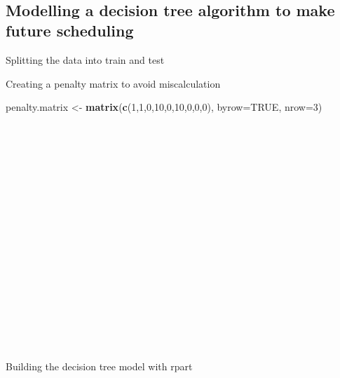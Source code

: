 \documentclass[
]{article}
\newenvironment{Shaded}{\begin{snugshade}}{\end{snugshade}}
\newcommand{\DataTypeTok}[1]{\textcolor[rgb]{0.13,0.29,0.53}{#1}}
\newcommand{\DecValTok}[1]{\textcolor[rgb]{0.00,0.00,0.81}{#1}}
\newcommand{\FloatTok}[1]{\textcolor[rgb]{0.00,0.00,0.81}{#1}}
\newcommand{\KeywordTok}[1]{\textcolor[rgb]{0.13,0.29,0.53}{\textbf{#1}}}
\newcommand{\NormalTok}[1]{#1}
\newcommand{\OperatorTok}[1]{\textcolor[rgb]{0.81,0.36,0.00}{\textbf{#1}}}
\newcommand{\OtherTok}[1]{\textcolor[rgb]{0.56,0.35,0.01}{#1}}
\newcommand{\StringTok}[1]{\textcolor[rgb]{0.31,0.60,0.02}{#1}}
\begin{document}
~

~

~

~

\hypertarget{modelling-a-decision-tree-algorithm-to-make-future-scheduling}{%
\subsection{Modelling a decision tree algorithm to make future
scheduling}\label{modelling-a-decision-tree-algorithm-to-make-future-scheduling}}

Splitting the data into train and test

\begin{Shaded}
\end{Shaded}

Creating a penalty matrix to avoid miscalculation

\begin{Shaded}
\begin{Highlighting}[]
\NormalTok{penalty.matrix <-}\StringTok{ }\KeywordTok{matrix}\NormalTok{(}\KeywordTok{c}\NormalTok{(}\DecValTok{1}\NormalTok{,}\DecValTok{1}\NormalTok{,}\DecValTok{0}\NormalTok{,}\DecValTok{10}\NormalTok{,}\DecValTok{0}\NormalTok{,}\DecValTok{10}\NormalTok{,}\DecValTok{0}\NormalTok{,}\DecValTok{0}\NormalTok{,}\DecValTok{0}\NormalTok{), }\DataTypeTok{byrow=}\OtherTok{TRUE}\NormalTok{, }\DataTypeTok{nrow=}\DecValTok{3}\NormalTok{)}
\end{Highlighting}
\end{Shaded}

~

~

~

~

~

~

~

~

~

~

Building the decision tree model with rpart
\end{document}
